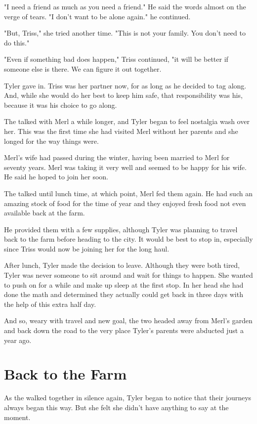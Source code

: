 \documentclass[courier]{sffms}
\begin{document}
"I need a friend as much as you need a friend."
He said the words almost on the verge of tears.
"I don't want to be alone again." he continued.

"But, Triss," she tried another time. "This is
not your family. You don't need to do this."

"Even if something bad does happen," Triss
continued, "it will
be better if someone else is there. We can
figure it out together.

Tyler gave in. Triss was her partner now, for
as long as he decided to tag along. And, while
she would do her best to keep him safe, that
responsibility was his, because it was his 
choice to go along.

The talked with Merl a while longer, and Tyler
began to feel nostalgia wash over her. This
was the first time she had visited Merl without
her parents and she longed for the way things
were.

Merl's wife had passed during the winter, having
been married to Merl for seventy years. Merl was
taking it very well and seemed to be happy
for his wife. He said he hoped to join her soon.

The talked until lunch time, at which point, Merl
fed them again. He had such an amazing stock
of food for the time of year and they enjoyed
fresh food not even available back at the farm.

He provided them with a few supplies, although
Tyler was planning to travel back to the farm
before heading to the city. It would be best
to stop in, especially since Triss would now be
joining her for the long haul.

After lunch, Tyler made the decision to leave.
Although they were both tired, Tyler was never
someone to sit around and wait for things to
happen. She wanted to push on for a while
and make up sleep at the first stop. In her
head she had done the math and determined
they actually could get back in three days with
the help of this extra half day.

And so, weary with travel and new goal, the two
headed away from Merl's garden and back down
the road to the very place Tyler's parents were
abducted just a year ago.

\chapter{Back to the Farm}
As the walked together in silence again, Tyler
began to notice that their journeys always
began this way. But she felt she didn't have
anything to say at the moment.
\end{document}
